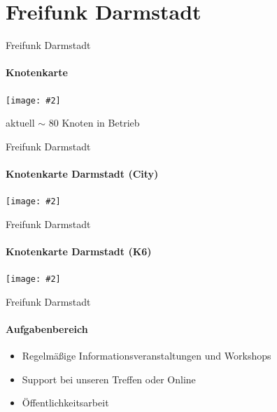\documentclass{beamer}
\newcommand{\centeredimage}[2][ ]{
        \begin{center}
            \texttt{[image: \#2]} $\;$

            \tiny{#1}
        \end{center}
}
\begin{document}
\section{Freifunk Darmstadt}
\begin{frame}{Freifunk Darmstadt}
\framesubtitle{Knotenkarte}
\centeredimage[aktuell $\sim$ 80 Knoten in Betrieb]{images/ffmap_darmstadt}
\end{frame}

\begin{frame}{Freifunk Darmstadt}
\framesubtitle{Knotenkarte Darmstadt (City)}
\centeredimage{images/ffmap_darmstadt_city}
\end{frame}

\begin{frame}{Freifunk Darmstadt}
\framesubtitle{Knotenkarte Darmstadt (K6)}
\centeredimage{images/ffmap_darmstadt_k6}
\end{frame}

\begin{frame}{Freifunk Darmstadt}
\framesubtitle{Aufgabenbereich}
\begin{itemize}
\item Regelmäßige Informationsveranstaltungen und Workshops
\item Support bei unseren Treffen oder Online
\item Öffentlichkeitsarbeit
\end{itemize}
\end{frame}
\end{document}
